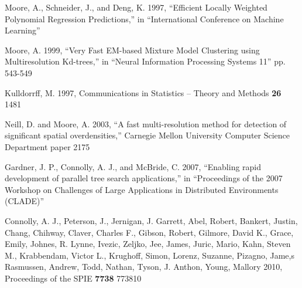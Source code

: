 \documentclass[prd,nofootbib,floatfix,11pt,tightenlines,nofootinbib]{revtex4}
\begin{document}
\begin{thebibliography}{99}
Moore, A., Schneider, J., and Deng, K. 1997,
``Efficient Locally Weighted Polynomial Regression Predictions,'' in
``International Conference on Machine Learning''

Moore, A. 1999, ``Very Fast EM-based Mixture Model Clustering using Multiresolution
Kd-trees,'' in ``Neural Information Processing Systems 11''  pp. 543-549

Kulldorrff, M. 1997,
Communications in Statistics -- Theory and Methods {\bf 26} 1481


Neill, D. and Moore, A. 2003,
``A fast multi-resolution method for detection of significant spatial overdensities,''
Carnegie Mellon University Computer Science Department paper 2175


Gardner, J. P., Connolly, A. J., and McBride, C. 2007,
``Enabling rapid development of parallel tree search applications,''
in ``Proceedings of the 2007 Workshop on Challenges of Large Applications in Distributed
Environments (CLADE)''

Connolly, A. J., Peterson, J., Jernigan, J. Garrett, Abel, Robert, Bankert, Justin,
Chang, Chihway, Claver, Charles F., Gibson, Robert, Gilmore, David K., Grace, Emily,
Johnes, R. Lynne, Ivezic, Zeljko, Jee, James, Juric, Mario, Kahn, Steven M.,
Krabbendam, Victor L., Krughoff, Simon, Lorenz, Suzanne, Pizagno, Jame,s Rasmussen,
Andrew, Todd, Nathan, Tyson, J. Anthon, Young, Mallory 2010, Proceedings of the SPIE
{\bf 7738} 773810






\end{thebibliography}
\end{document}
